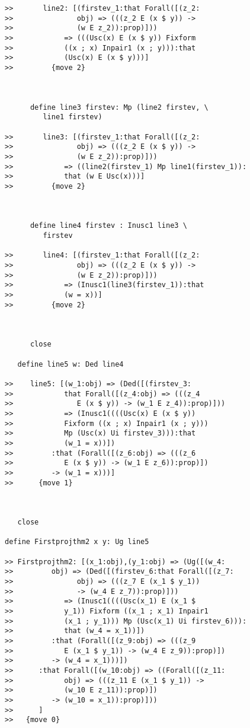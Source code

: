 \documentclass[12pt]{article}
\begin{document}
\begin{verbatim}
>>       line2: [(firstev_1:that Forall([(z_2:
>>               obj) => (((z_2 E (x $ y)) ->
>>               (w E z_2)):prop)]))
>>            => (((Usc(x) E (x $ y)) Fixform
>>            ((x ; x) Inpair1 (x ; y))):that
>>            (Usc(x) E (x $ y)))]
>>         {move 2}



      define line3 firstev: Mp (line2 firstev, \
         line1 firstev)

>>       line3: [(firstev_1:that Forall([(z_2:
>>               obj) => (((z_2 E (x $ y)) ->
>>               (w E z_2)):prop)]))
>>            => ((line2(firstev_1) Mp line1(firstev_1)):
>>            that (w E Usc(x)))]
>>         {move 2}



      define line4 firstev : Inusc1 line3 \
         firstev

>>       line4: [(firstev_1:that Forall([(z_2:
>>               obj) => (((z_2 E (x $ y)) ->
>>               (w E z_2)):prop)]))
>>            => (Inusc1(line3(firstev_1)):that
>>            (w = x))]
>>         {move 2}



      close

   define line5 w: Ded line4

>>    line5: [(w_1:obj) => (Ded([(firstev_3:
>>            that Forall([(z_4:obj) => (((z_4
>>               E (x $ y)) -> (w_1 E z_4)):prop)]))
>>            => (Inusc1((((Usc(x) E (x $ y))
>>            Fixform ((x ; x) Inpair1 (x ; y)))
>>            Mp (Usc(x) Ui firstev_3))):that
>>            (w_1 = x))])
>>         :that (Forall([(z_6:obj) => (((z_6
>>            E (x $ y)) -> (w_1 E z_6)):prop)])
>>         -> (w_1 = x)))]
>>      {move 1}



   close

define Firstprojthm2 x y: Ug line5

>> Firstprojthm2: [(x_1:obj),(y_1:obj) => (Ug([(w_4:
>>         obj) => (Ded([(firstev_6:that Forall([(z_7:
>>               obj) => (((z_7 E (x_1 $ y_1))
>>               -> (w_4 E z_7)):prop)]))
>>            => (Inusc1((((Usc(x_1) E (x_1 $
>>            y_1)) Fixform ((x_1 ; x_1) Inpair1
>>            (x_1 ; y_1))) Mp (Usc(x_1) Ui firstev_6))):
>>            that (w_4 = x_1))])
>>         :that (Forall([(z_9:obj) => (((z_9
>>            E (x_1 $ y_1)) -> (w_4 E z_9)):prop)])
>>         -> (w_4 = x_1)))])
>>      :that Forall([(w_10:obj) => ((Forall([(z_11:
>>            obj) => (((z_11 E (x_1 $ y_1)) ->
>>            (w_10 E z_11)):prop)])
>>         -> (w_10 = x_1)):prop)]))
>>      ]
>>   {move 0}


\end{verbatim}
\end{document}

